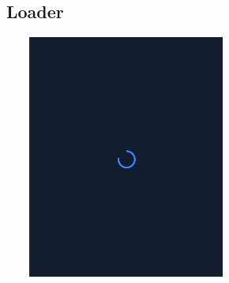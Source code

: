 \subsection{Loader}

\begin{center}
\includegraphics[width=8cm, height=8cm]{dart/loader.png}\\[0.5cm]
\end{center}


